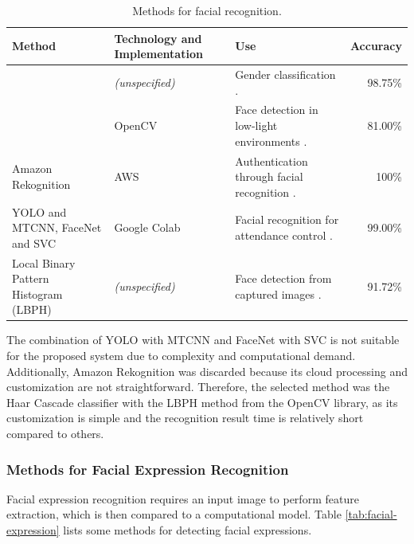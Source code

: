 \documentclass[a4paper,fleqn]{cas-sc}
\begin{document}
					\begin{table}[h]
						\caption{Methods for facial recognition.}
						\label{tab:facial-recognition}
						\centering
						\begin{tabular}{p{}p{0.23\textwidth}p{}p{}}
							\hline
							\multicolumn{1}{l}{\textbf{Method}} & \multicolumn{1}{l}{\textbf{Technology and Implementation}} & \multicolumn{1}{l}{\textbf{Use}} & \multicolumn{1}{l}{\textbf{Accuracy}} \\ \hline
							\rule{0pt}{12pt}\multirow{2}{*}{Haar Cascade Classifier} & \textit{(unspecified)} & Gender classification \citep{Priyanka2012Hybrid}. & \multicolumn{1}{r}{98.75\%} \\
							& \rule{0pt}{12pt}OpenCV & Face detection in low-light environments \citep{Le2022Facial}. & \multicolumn{1}{r}{81.00\%} \\
							\rule{0pt}{12pt}Amazon Rekognition & AWS & Authentication through facial recognition \citep{Girmay2021AI}. & \multicolumn{1}{r}{100\%} \\
							\rule{0pt}{12pt}YOLO and MTCNN, FaceNet and SVC & Google Colab & Facial recognition for attendance control \citep{Darapaneni2020Automatic}. & \multicolumn{1}{r}{99.00\%} \\
							\rule{0pt}{12pt}Local Binary Pattern Histogram (LBPH) & \textit{(unspecified)} & Face detection from captured images \citep{Garcia2021Application}. & \multicolumn{1}{r}{91.72\%} \\ \hline
						\end{tabular}
					\end{table}
					The combination of YOLO with MTCNN and FaceNet with SVC is not suitable for the proposed system due to complexity and computational demand. Additionally, Amazon Rekognition was discarded because its cloud processing and customization are not straightforward. Therefore, the selected method was the Haar Cascade classifier with the LBPH method from the OpenCV library, as its customization is simple and the recognition result time is relatively short compared to others.
					
				\subsubsection*{Methods for Facial Expression Recognition}				
					Facial expression recognition requires an input image to perform feature extraction, which is then compared to a computational model. Table \ref{tab:facial-expression} lists some methods for detecting facial expressions.
					
\end{document}
